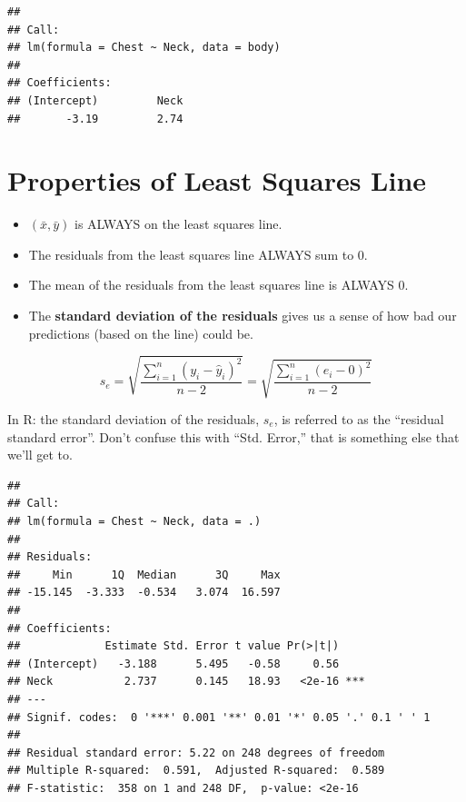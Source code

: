 \documentclass[]{book}
\newenvironment{Shaded}{\begin{snugshade}}{\end{snugshade}}
\newcommand{\CommentTok}[1]{\textcolor[rgb]{0.56,0.35,0.01}{\textit{#1}}}
\newcommand{\DataTypeTok}[1]{\textcolor[rgb]{0.13,0.29,0.53}{#1}}
\newcommand{\KeywordTok}[1]{\textcolor[rgb]{0.13,0.29,0.53}{\textbf{#1}}}
\newcommand{\NormalTok}[1]{#1}
\newcommand{\OperatorTok}[1]{\textcolor[rgb]{0.81,0.36,0.00}{\textbf{#1}}}
\newcommand{\StringTok}[1]{\textcolor[rgb]{0.31,0.60,0.02}{#1}}
\begin{document}
\begin{verbatim}
## 
## Call:
## lm(formula = Chest ~ Neck, data = body)
## 
## Coefficients:
## (Intercept)         Neck  
##       -3.19         2.74
\end{verbatim}

\hypertarget{properties-of-least-squares-line}{%
\section{Properties of Least Squares Line}\label{properties-of-least-squares-line}}

\begin{itemize}
\item
  \((\bar{x},\bar{y})\) is ALWAYS on the least squares line.
\item
  The residuals from the least squares line ALWAYS sum to 0.
\item
  The mean of the residuals from the least squares line is ALWAYS 0.
\item
  The \textbf{standard deviation of the residuals} gives us a sense of how bad our predictions (based on the line) could be.
\end{itemize}

\[s_e = \sqrt{\frac{\sum^n_{i=1} (y_i-\hat{y}_i)^2}{n-2}}  = \sqrt{\frac{\sum^n_{i=1} (e_i-0)^2}{n-2}} \]

In R: the standard deviation of the residuals, \(s_e\), is referred to as the ``residual standard error''. Don't confuse this with ``Std. Error,'' that is something else that we'll get to.

\begin{Shaded}
\end{Shaded}

\begin{verbatim}
## 
## Call:
## lm(formula = Chest ~ Neck, data = .)
## 
## Residuals:
##     Min      1Q  Median      3Q     Max 
## -15.145  -3.333  -0.534   3.074  16.597 
## 
## Coefficients:
##             Estimate Std. Error t value Pr(>|t|)    
## (Intercept)   -3.188      5.495   -0.58     0.56    
## Neck           2.737      0.145   18.93   <2e-16 ***
## ---
## Signif. codes:  0 '***' 0.001 '**' 0.01 '*' 0.05 '.' 0.1 ' ' 1
## 
## Residual standard error: 5.22 on 248 degrees of freedom
## Multiple R-squared:  0.591,  Adjusted R-squared:  0.589 
## F-statistic:  358 on 1 and 248 DF,  p-value: <2e-16
\end{verbatim}
\end{document}

